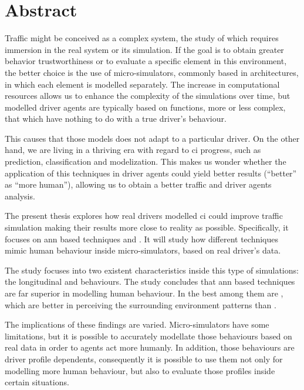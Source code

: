 \cleardoublepage
\thispagestyle{empty}
\chapter*{Abstract}
\begin{fullwidth}
	Traffic might be conceived as a complex system, the study of which requires immersion in the real system or its simulation. If the goal is to obtain greater behavior trustworthiness or to evaluate a specific element in this environment, the better choice is the use of micro-simulators, commonly based in  architectures, in which each element is modelled separately. The increase in computational resources allows us to enhance the complexity of the simulations over time, but modelled driver agents are typically based on functions, more or less complex, that which have nothing to do with a true driver’s behaviour. 
	
	This causes that those models does not adapt to a particular driver. On the other hand, we are living in a thriving era with regard to \Acrlong{ci} progress, such as prediction, classification and modelization. This makes us wonder whether the application of this techniques in driver agents could yield better results (\enquote{better} as \enquote{more human}), allowing us to obtain a better traffic and driver agents analysis.
	
	The present thesis explores how real drivers modelled \acrlong{ci} could improve traffic simulation making their results more close to reality as possible. Specifically, it focuses on \Acrlong{ann} based techniques and . It will study how different techniques mimic human behaviour inside micro-simulators, based on real driver’s data.
	
	The study focuses into two existent characteristics inside this type of simulations: the longitudinal and  behaviours. The study concludes that \acrlong{ann} based techniques are far superior in modelling human behaviour. In  the best among them are , which are better in perceiving the surrounding environment patterns than .
	
	The implications of these findings are varied. Micro-simulators have some limitations, but it is possible to accurately modellate those behaviours based on real data in order to agents act more humanly. In addition, those behaviours are driver profile dependents, consequently it is possible to use them not only for modelling more human behaviour, but also to evaluate those profiles inside certain situations.
	

\end{fullwidth}
